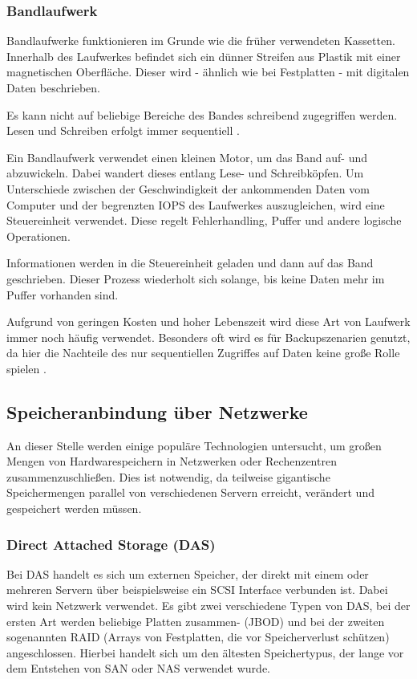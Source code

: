 \subsubsection{Bandlaufwerk}

Bandlaufwerke funktionieren im Grunde wie die früher verwendeten Kassetten. Innerhalb des Laufwerkes befindet sich ein dünner Streifen aus Plastik mit einer magnetischen Oberfläche. Dieser wird - ähnlich wie bei Festplatten - mit digitalen Daten beschrieben. 

Es kann nicht auf beliebige Bereiche des Bandes schreibend zugegriffen werden. Lesen und Schreiben erfolgt immer sequentiell \parencite{adrc.2009}.

Ein Bandlaufwerk verwendet einen kleinen Motor, um das Band auf- und abzuwickeln. Dabei wandert dieses entlang Lese- und Schreibköpfen. Um Unterschiede zwischen der Geschwindigkeit der ankommenden Daten vom Computer und der begrenzten \gls{IOPS} des Laufwerkes auszugleichen, wird eine Steuereinheit verwendet. Diese regelt Fehlerhandling, Puffer und andere logische Operationen.

Informationen werden in die Steuereinheit geladen und dann auf das Band geschrieben. Dieser Prozess wiederholt sich solange, bis keine Daten mehr im Puffer vorhanden sind.

Aufgrund von geringen Kosten und hoher Lebenszeit wird diese Art von Laufwerk immer noch häufig verwendet. Besonders oft wird es für Backupszenarien genutzt, da hier die Nachteile des nur sequentiellen Zugriffes auf Daten keine große Rolle spielen \parencite{adrc.2009}. 

\subsection{Speicheranbindung über Netzwerke}

An dieser Stelle werden einige populäre Technologien untersucht, um großen Mengen von Hardwarespeichern in Netzwerken oder Rechenzentren zusammenzuschließen. Dies ist notwendig, da teilweise gigantische Speichermengen parallel von verschiedenen Servern erreicht, verändert und gespeichert werden müssen.

\subsubsection{Direct Attached Storage (DAS)}

Bei \ac{DAS} handelt es sich um externen Speicher, der direkt mit einem oder mehreren Servern über beispielsweise ein \gls{SCSI} Interface verbunden ist. Dabei wird kein Netzwerk verwendet. Es gibt zwei verschiedene Typen von \ac{DAS}, bei der ersten Art werden beliebige Platten zusammen- (\ac{JBOD}) und bei der zweiten sogenannten \acs{RAID} (Arrays von Festplatten, die vor Speicherverlust schützen) angeschlossen.
Hierbei handelt sich um den ältesten Speichertypus, der lange vor dem Entstehen von SAN oder NAS verwendet wurde.

